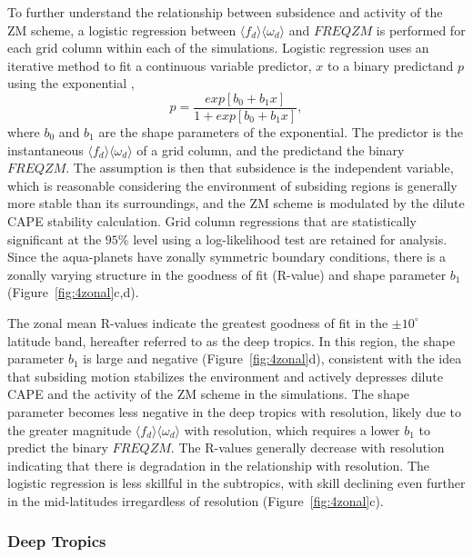\documentclass[alpha-refs]{wiley-article}
\begin{document}
To further understand the relationship between subsidence and activity of the ZM scheme, a logistic regression between $\langle f_{d} \rangle \langle \omega_{d} \rangle$ and $FREQZM$ is performed for each grid column within each of the simulations. Logistic regression uses an iterative method to fit a continuous variable predictor, $x$ to a binary predictand $p$ using the exponential \citep{WILKSBOOK},
\begin{equation}
p = \frac{exp{[b_0 + b_1 x]}}{1 + exp{[b_0 + b_1 x]}}, \label{eq:logreg}
\end{equation}
where $b_0$ and $b_1$ are the shape parameters of the exponential. The predictor is the instantaneous $\langle f_{d} \rangle \langle \omega_{d} \rangle$ of a grid column, and the predictand the binary $FREQZM$. The assumption is then that subsidence is the independent variable, which is reasonable considering the environment of subsiding regions is generally more stable than its surroundings, and the ZM scheme is modulated by the dilute CAPE stability calculation. Grid column regressions that are statistically significant at the $95\%$ level using a log-likelihood test \citep{WILKSBOOK} are retained for analysis. Since the aqua-planets have zonally symmetric boundary conditions, there is a zonally varying structure in the goodness of fit (R-value) and shape parameter $b_1$ (Figure~\ref{fig:4zonal}c,d).

The zonal mean R-values indicate the greatest goodness of fit in the $\pm 10^{\circ}$ latitude band, hereafter referred to as the deep tropics. In this region, the shape parameter $b_1$ is large and negative (Figure~\ref{fig:4zonal}d), consistent with the idea that subsiding motion stabilizes the environment and actively depresses dilute CAPE and the activity of the ZM scheme in the simulations. The shape parameter becomes less negative in the deep tropics with resolution, likely due to the greater magnitude $\langle f_{d} \rangle \langle \omega_{d} \rangle$ with resolution, which requires a lower $b_1$ to predict the binary $FREQZM$. The R-values generally decrease with resolution indicating that there is degradation in the relationship with resolution. The logistic regression is less skillful in the subtropics, with skill declining even further in the mid-latitudes irregardless of resolution (Figure~\ref{fig:4zonal}c).

\subsubsection{Deep Tropics}
\end{document}
